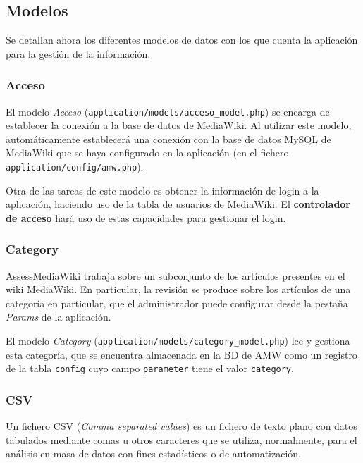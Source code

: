 \documentclass[11pt]{article}
\begin{document}
\subsection{Modelos}

Se detallan ahora los diferentes modelos de datos con los que cuenta la
aplicación para la gestión de la información.

\subsubsection{Acceso}

El modelo \textit{Acceso} (\texttt{application/models/acceso\_model.php}) se encarga
de establecer la conexión a la base de datos de MediaWiki. Al utilizar este
modelo, automáticamente establecerá una conexión con la base de datos MySQL de
MediaWiki que se haya configurado en la aplicación (en el fichero
\texttt{application/config/amw.php}).

Otra de las tareas de este modelo es obtener la información de login a la
aplicación, haciendo uso de la tabla de usuarios de MediaWiki. El
\textbf{controlador de acceso} hará uso de estas capacidades para gestionar el
login.

\subsubsection{Category}

AssessMediaWiki trabaja sobre un subconjunto de los artículos presentes en el
wiki MediaWiki. En particular, la revisión se produce sobre los artículos de una
categoría en particular, que el administrador puede configurar desde la pestaña
\textit{Params} de la aplicación.

El modelo \textit{Category} (\texttt{application/models/category\_model.php})
lee y gestiona esta categoría, que se encuentra almacenada en la BD de AMW como
un registro de la tabla \texttt{config} cuyo campo \texttt{parameter} tiene el
valor \texttt{category}.

\subsubsection{CSV}

Un fichero CSV (\textit{Comma separated values}) es un fichero de texto plano
con datos tabulados mediante comas u otros caracteres que se utiliza,
normalmente, para el análisis en masa de datos con fines estadísticos o de
automatización.
\end{document}
